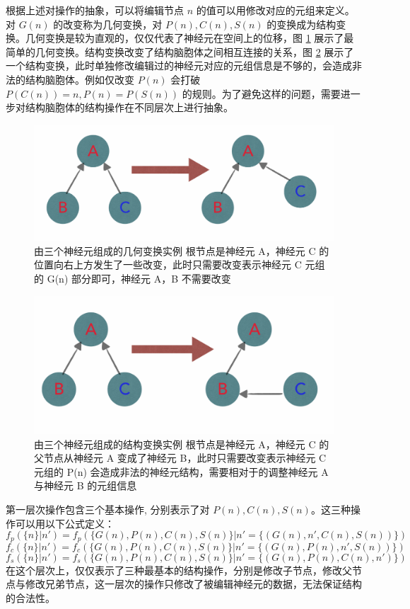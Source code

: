 根据上述对操作的抽象，可以将编辑节点 $n$ 的值可以用修改对应的元组来定义。对 $G(n)$ 的改变称为几何变换，对 $P(n), C(n), S(n)$ 的变换成为结构变换。几何变换是较为直观的，仅仅代表了神经元在空间上的位移，图 \ref{gem} 展示了最简单的几何变换。结构变换改变了结构脑胞体之间相互连接的关系，图 \ref{stru} 展示了一个结构变换，此时单独修改编辑过的神经元对应的元组信息是不够的，会造成非法的结构脑胞体。例如仅改变 $P(n)$ 会打破 $P(C(n)) = n, P(n) = P(S(n))$ 的规则。为了避免这样的问题，需要进一步对结构脑胞体的结构操作在不同层次上进行抽象。

\begin{figure}[!ht]
\centering
\includegraphics[width=148mm]{images/gem}
\caption{由三个神经元组成的几何变换实例 根节点是神经元 A，神经元 C 的位置向右上方发生了一些改变，此时只需要改变表示神经元 C 元组的 G(n) 部分即可，神经元 A，B 不需要改变}
\label{gem}
\end{figure}

\begin{figure}[!ht]
\centering
\includegraphics[width=148mm]{images/stru}
\caption{由三个神经元组成的结构变换实例 根节点是神经元 A，神经元 C 的
父节点从神经元 A 变成了神经元 B，此时只需要改变表示神经元 C 元组的 P(n) 会造成非法的神经元结构，需要相对于的调整神经元 A 与神经元 B 的元组信息}
\label{stru}
\end{figure}

第一层次操作包含三个基本操作, 分别表示了对 $P(n), C(n), S(n)$。这三种操作可以用以下公式定义：
$$f_p(\{n\}|n') = f_p(\{G(n), P(n), C(n), S(n)\}|n' = \{(G(n), n', C(n), S(n))\})$$
$$f_c(\{n\}|n') = f_c(\{G(n), P(n), C(n), S(n)\}|n' = \{(G(n), P(n), n', S(n))\})$$
$$f_s(\{n\}|n') = f_s(\{G(n), P(n), C(n), S(n)\}|n' = \{(G(n), P(n), C(n), n')\})$$
在这个层次上，仅仅表示了三种最基本的结构操作，分别是修改子节点，修改父节点与修改兄弟节点，这一层次的操作只修改了被编辑神经元的数据，无法保证结构的合法性。

